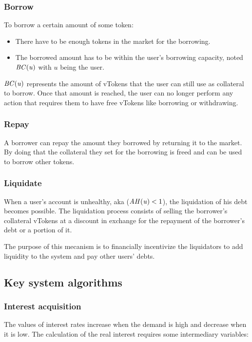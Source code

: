 \subsubsection{Borrow}
To borrow a certain amount of some token:

\begin{itemize}
  \item There have to be enough tokens in the market for the borrowing.
  \item The borrowed amount has to be within the user's borrowing capacity, noted $\mathit{BC(u)}$ with $u$ being the user.
\end{itemize}

$\mathit{BC(u)}$ represents the amount of vTokens that the user can still use as collateral to borrow. Once that amount is reached, the user can no longer perform any action that requires them to have free vTokens like borrowing or withdrawing.

\subsubsection{Repay}

A borrower can repay the amount they borrowed by returning it to the market. By doing that the collateral they set for the borrowing is freed and can be used to borrow other tokens.

\subsubsection{Liquidate}
When a user's account is unhealthy, aka ($\mathit{AH(u)} < 1$), the liquidation of his debt becomes possible. The liquidation process consists of selling the borrower's collateral vTokens at a discount in exchange for the repayment of the borrower's debt or a portion of it.

The purpose of this mecanism is to financially incentivize the liquidators to add liquidity to the system and pay other users' debts.

\subsection{Key system algorithms}

\subsubsection{Interest acquisition}

The values of interest rates increase when the demand is high and decrease when it is low. The calculation of the real interest requires some intermediary variables:

